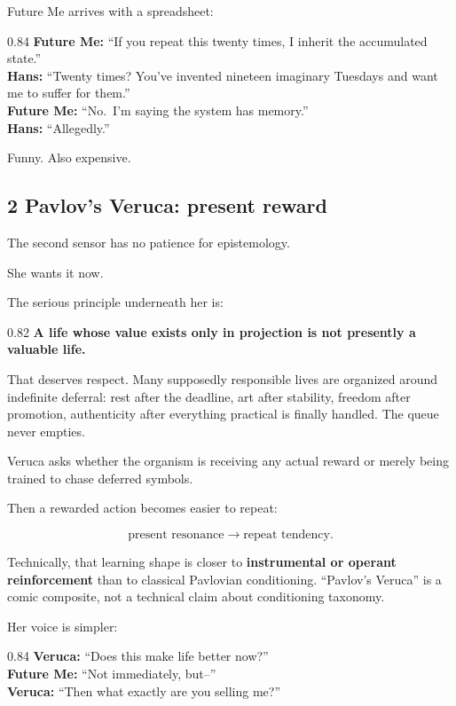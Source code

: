 \documentclass[10pt,letterpaper]{article}
\newenvironment{paperbody}
  {\begingroup\justifying}
  {\par\endgroup}
\newenvironment{dialoguebox}
  {\Needspace{5\baselineskip}\par\vspace{0.26em}\begin{center}\begingroup
   \begin{lrbox}{\dialogueboxsave}\begin{varwidth}{0.84\linewidth}
   \small\rmfamily\upshape\RaggedRight}
  {\end{varwidth}\end{lrbox}\fbox{\usebox{\dialogueboxsave}}
   \endgroup\end{center}\vspace{0.26em}}
\newenvironment{thesisbox}
  {\Needspace{3.5\baselineskip}\par\vspace{0.32em}\begin{center}\begingroup
   \begin{lrbox}{\thesisboxsave}\begin{varwidth}{0.82\linewidth}
   \normalsize\rmfamily\bfseries\upshape\RaggedRight}
  {\end{varwidth}\end{lrbox}\fbox{\usebox{\thesisboxsave}}
   \endgroup\end{center}\vspace{0.32em}}
\let\oldsubsection\subsection
\renewcommand{\subsection}{\Needspace{5\baselineskip}\oldsubsection}
\begin{document}
\begin{paperbody}
Future Me arrives with a spreadsheet:

\begin{dialoguebox}
\textbf{Future Me:} ``If you repeat this twenty times, I inherit the
accumulated state.''\\[0.35em]
\textbf{Hans:} ``Twenty times? You've invented nineteen imaginary
Tuesdays and want me to suffer for them.''\\[0.35em]
\textbf{Future Me:} ``No.~I'm saying the system has memory.''\\[0.35em]
\textbf{Hans:} ``Allegedly.''
\end{dialoguebox}

Funny. Also expensive.

\subsection{2 Pavlov's Veruca: present
reward}\label{pavlovs-veruca-present-reward}

The second sensor has no patience for epistemology.

She wants it now.

The serious principle underneath her is:

\begin{thesisbox}
A life whose value exists only in projection is not presently a
valuable life.
\end{thesisbox}

That deserves respect. Many supposedly responsible lives are organized
around indefinite deferral: rest after the deadline, art after
stability, freedom after promotion, authenticity after everything
practical is finally handled. The queue never empties.

Veruca asks whether the organism is receiving any actual reward or
merely being trained to chase deferred symbols.

Then a rewarded action becomes easier to repeat:

\[
\text{present resonance}
\to
\text{repeat tendency}.
\]

Technically, that learning shape is closer to \textbf{instrumental or
operant reinforcement} than to classical Pavlovian conditioning.
``Pavlov's Veruca'' is a comic composite, not a technical claim about
conditioning taxonomy.

Her voice is simpler:

\begin{dialoguebox}
\textbf{Veruca:} ``Does this make life better now?''\\[0.35em]
\textbf{Future Me:} ``Not immediately, but--''\\[0.35em]
\textbf{Veruca:} ``Then what exactly are you selling me?''
\end{dialoguebox}


\end{paperbody}
\end{document}
